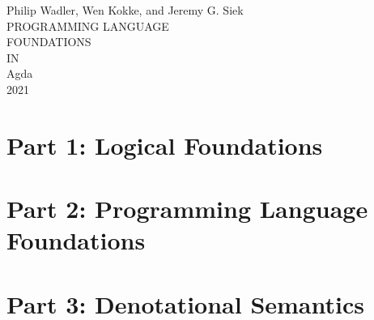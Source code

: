 \documentclass[10pt]{book}
\begin{document}
\setlength{\mathindent}{0pt}
\setlength{\parindent}{0em}
\setlength{\parskip}{1em}

\providecommand{\tightlist}{%
  \setlength{\itemsep}{0pt}\setlength{\parskip}{0pt}}

\begin{titlepage}
  \newlength{\drop}%
  \setlength{\drop}{0.12\textheight}%
  \centering%
  \vspace*{\drop}
  \begingroup%
  {\large Philip Wadler, Wen Kokke, and Jeremy G. Siek}\\[\baselineskip]
  {\Huge PROGRAMMING LANGUAGE}\\[\baselineskip]
  {\Huge FOUNDATIONS}\\[\baselineskip]
  {\Large IN}\\[\baselineskip]
  {\Huge Agda}\\[\drop]
  \vfill%
  {\small\scshape 2021}\par%
  \null\endgroup
\end{titlepage}

\frontmatter
\setcounter{tocdepth}{0}

\tableofcontents
\setcounter{tocdepth}{1}





\mainmatter%

\part{Part 1: Logical Foundations}











\part{Part 2: Programming Language Foundations}










\part{Part 3: Denotational Semantics}






\cleardoublepage%
%

\appendix
{}




\end{document}
